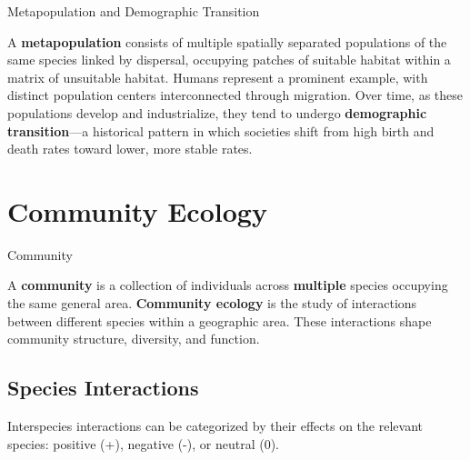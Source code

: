\documentclass[10pt]{article}
\begin{document}
    \begin{core}{Metapopulation and Demographic Transition}

      A \textbf{metapopulation} consists of multiple spatially separated populations of the same species linked by dispersal, occupying patches of suitable habitat within a matrix of unsuitable habitat. Humans represent a prominent example, with distinct population centers interconnected through migration. Over time, as these populations develop and industrialize, they tend to undergo \textbf{demographic transition}---a historical pattern in which societies shift from high birth and death rates toward lower, more stable rates.

    \end{core}

\section{Community Ecology}

  \begin{core}[label=core:commeco]{Community}

    A \textbf{community} is a collection of individuals across \textbf{multiple} species occupying the same general area. \textbf{Community ecology} is the study of interactions between different species within a geographic area. These interactions shape community structure, diversity, and function.

  \end{core}

  \subsection{Species Interactions}

      Interspecies interactions can be categorized by their effects on the relevant species: positive (+), negative (-), or neutral (0).
\end{document}
